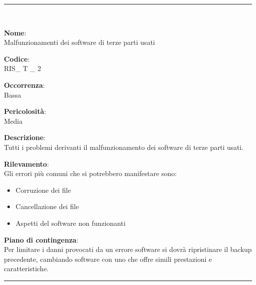 \noindent\rule{\textwidth}{1pt}\\

{\setlength{\parindent}{0cm}
\begin{minipage}{\textwidth} 
\begin{multicols}{4}
\textbf{Nome}: \\ Malfunzionamenti dei software di terze parti usati \columnbreak

\textbf{Codice}: \\ RIS\_ T \_ 2 
\columnbreak

\textbf{Occorrenza}: \\ Bassa
\columnbreak

\textbf{Pericolosità}: \\ Media

\end{multicols}

\begin{multicols}{3}

\textbf{Descrizione}: \\ Tutti i problemi derivanti il malfunzionamento dei software di terze parti usati.
\columnbreak

\textbf{Rilevamento}: \\ Gli errori più comuni che si potrebbero manifestare sono:
\begin{itemize}
	\item Corruzione dei file
	\item Cancellazione dei file
	\item Aspetti del software non funzionanti
\end{itemize}

\columnbreak

\textbf{Piano di contingenza}: \\ Per limitare i danni provocati da un errore software si dovrà ripristinare il backup precedente, cambiando software con uno che offre simili prestazioni e caratteristiche.\\

\columnbreak
\end{multicols}
\end{minipage}}

\noindent\rule{\textwidth}{1pt}\\

